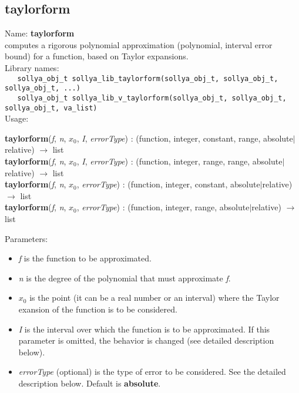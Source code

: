\subsection{taylorform}
\label{labtaylorform}
\noindent Name: \textbf{taylorform}\\
\phantom{aaa}computes a rigorous polynomial approximation (polynomial, interval error bound) for a function, based on Taylor expansions.\\[0.2cm]
\noindent Library names:\\
\verb|   sollya_obj_t sollya_lib_taylorform(sollya_obj_t, sollya_obj_t, sollya_obj_t, ...)|\\
\verb|   sollya_obj_t sollya_lib_v_taylorform(sollya_obj_t, sollya_obj_t, sollya_obj_t, va_list)|\\[0.2cm]
\noindent Usage: 
\begin{center}
\textbf{taylorform}(\emph{f}, \emph{n}, \emph{$x_0$}, \emph{I}, \emph{errorType}) : (\textsf{function}, \textsf{integer}, \textsf{constant}, \textsf{range}, \textsf{absolute$|$relative}) $\rightarrow$ \textsf{list}\\
\textbf{taylorform}(\emph{f}, \emph{n}, \emph{$x_0$}, \emph{I}, \emph{errorType}) : (\textsf{function}, \textsf{integer}, \textsf{range}, \textsf{range}, \textsf{absolute$|$relative}) $\rightarrow$ \textsf{list}\\
\textbf{taylorform}(\emph{f}, \emph{n}, \emph{$x_0$}, \emph{errorType}) : (\textsf{function}, \textsf{integer}, \textsf{constant}, \textsf{absolute$|$relative}) $\rightarrow$ \textsf{list}\\
\textbf{taylorform}(\emph{f}, \emph{n}, \emph{$x_0$}, \emph{errorType}) : (\textsf{function}, \textsf{integer}, \textsf{range}, \textsf{absolute$|$relative}) $\rightarrow$ \textsf{list}\\
\end{center}
Parameters: 
\begin{itemize}
\item \emph{f} is the function to be approximated.
\item \emph{n} is the degree of the polynomial that must approximate \emph{f}.
\item \emph{$x_0$} is the point (it can be a real number or an interval) where the Taylor exansion of the function is to be considered.
\item \emph{I} is the interval over which the function is to be approximated. If this parameter is omitted, the behavior is changed (see detailed description below).
\item \emph{errorType} (optional) is the type of error to be considered. See the detailed description below. Default is \textbf{absolute}.
\end{itemize}
